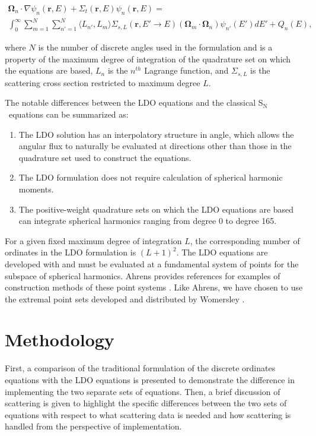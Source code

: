 \documentclass{article} %
\newcommand{\bo}{\mathbf\Omega}
\newcommand{\vecr}{\textbf{r}}
\newcommand{\sn}{S$_\mathrm{N}$}
\begin{document}
\begin{multline}
\bo_n\cdot\nabla\psi_{n}(\vecr,E) + 
\Sigma_{t}(\vecr,E)\psi_{n}(\vecr,E) = \\
\int_0^\infty\sum_{m=1}^{N}\sum_{n'=1}^{N}\langle L_{n'},L_{m}\rangle
\Sigma_{s,L}(\vecr,E'\rightarrow E)(\bo_{m}\cdot\bo_n)\psi_{n'}(E')dE'
+ Q_{n}(E),
\end{multline}

\noindent where $N$ is the number of discrete angles used in the formulation
and is a property of the maximum degree of integration of the quadrature set
on which the equations are based, $L_n$ is the $n^{th}$ Lagrange function, and
$\Sigma_{s,L}$ is the scattering cross section restricted to maximum degree
$L$.

The notable differences between the LDO equations and the classical \sn\
equations can be summarized as:

\begin{enumerate}
\item{The LDO solution has an interpolatory structure in angle, which allows
      the angular flux to naturally be evaluated at directions other than those
      in the quadrature set used to construct the equations.}
\item{The LDO formulation does not require calculation of spherical harmonic
      moments.}
\item{The positive-weight quadrature sets on which the LDO equations are based
      can integrate spherical harmonics ranging from degree 0 to degree 165.}
\end{enumerate}

For a given fixed maximum degree of integration $L$, the corresponding number
of ordinates in the LDO formulation is $(L+1)^2$. The LDO equations are
developed with and must be evaluated at a fundamental system of points for the
subspace of spherical harmonics. Ahrens provides references for examples of
construction methods of these point systems \cite{ahrens}. Like Ahrens, we
have chosen to use the extremal point sets developed and distributed by
Womersley \cite{wom}.

\section{Methodology}

First, a comparison of the traditional formulation of the discrete ordinates
equations with the LDO equations is presented to demonstrate the difference
in implementing the two separate sets of equations. Then, a brief discussion
of  scattering is given to highlight the specific differences between the two
sets of equations with respect to what scattering data is needed and how
scattering is handled from the perspective of implementation.
\end{document}
